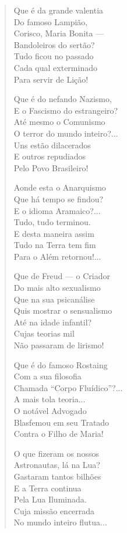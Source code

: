 \begin{verse}
Que é da grande valentia \\
Do famoso Lampião, \\
Corisco, Maria Bonita --- \\
Bandoleiros do sertão? \\
Tudo ficou no passado \\
Cada qual exterminado \\
Para servir de Lição! 

Que é do nefando Nazismo, \\
E o Fascismo do estrangeiro? \\
Até mesmo o Comunismo \\
O terror do mundo inteiro?... \\
Uns estão dilacerados \\
E outros repudiados \\
Pelo Povo Brasileiro! 

Aonde esta o Anarquismo \\
Que há tempo se findou? \\
E o idioma Aramaico?... \\
Tudo, tudo terminou. \\
E desta maneira assim \\
Tudo na Terra tem fim \\
Para o Além retornou!... 
\pagebreak

Que de Freud ---  o Criador \\
Do mais alto sexualismo \\
Que na sua psicanálise \\
Quis mostrar o sensualismo \\
Até na idade infantil? \\
Cujas teorias mil \\
Não passaram de lirismo! 

Que é do famoso Rostaing \\
Com a sua filosofia \\
Chamada ``Corpo Fluídico''?... \\
A mais tola teoria...\\
O notável Advogado \\
Blasfemou em seu Tratado \\
Contra o Filho de Maria! 

O que fizeram os nossos \\
Astronautas, lá na Lua? \\
Gastaram tantos bilhões \\
E a Terra continua \\
Pela Lua Iluminada. \\
Cuja missão encerrada \\
No mundo inteiro flutua...


\end{verse}
